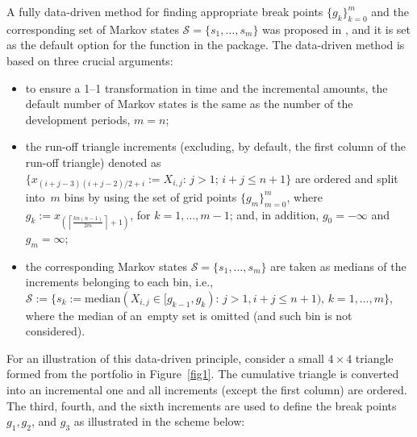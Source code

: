 A fully data-driven method for finding appropriate break points $\{g_k\}_{k = 0}^m$ and the corresponding set of Markov states $\mathcal{S} = \{s_1, \dots, s_m\}$ was proposed in \cite{MMP2022}, and it is set as the default option for the  function in the  package. The data-driven method is based on three crucial arguments: 
\begin{itemize}[topsep=0pt, partopsep=0pt, itemsep=0pt, parsep=0pt, labelindent=0pt, leftmargin=18pt]
\item[(i)] to ensure a 1--1 transformation in time and
  the incremental amounts, the default number of Markov states  is the same
  as the number of the development periods, $m = n$;

\item[(ii)] the run-off triangle increments (excluding, by default, the first column of the run-off triangle) denoted as $\{x_{(i+j-3)(i+j-2)/2+i}:=X_{i,j}:\,j>1;\,i+j\leq n+1\}$ are ordered and split into~$m$ bins by using the set of grid points $\{g_m\}_{m = 0}^m$, where 
$g_k:=x_{\left(\left\lceil \frac{kn(n-1)}{2m}\right\rceil+1\right)}$, for $k=1,\ldots,m-1$; 
and, in addition, $g_0 = - \infty$ and $g_m = \infty$;
\item[(iii)] the corresponding Markov states $\mathcal{S} = \{s_1, \dots, s_m\}$ are taken as medians of the increments  belonging to each bin, i.e., $\mathcal{S}:=\big\{s_k:=\mbox{median}(X_{i,j}\in[g_{k-1},g_k):\,j>1,i+j\leq n+1),\,k=1,\ldots,m\big\}$, where the median of an~empty set is omitted (and such bin is not considered).
\end{itemize}
For an illustration of this data-driven principle, consider a small $4 \times 4$ triangle formed 
from the portfolio in Figure~\ref{fig1}. The cumulative triangle is converted into an incremental one 
and all increments (except the first column) are ordered. The third, fourth, and the sixth increments are used to 
define the break points $g_1, g_2$, and $g_3$ as illustrated in the scheme below:

